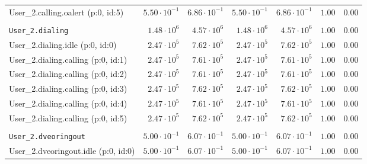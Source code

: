 \begin{table}[htbp]
{\begin{tabular}{lrrrrrr}
\hspace{3mm}User\_2.calling.oalert (p:0, id:5)        & $5.50 \cdot 10^{-1}$ & $6.86 \cdot 10^{-1}$ & $5.50 \cdot 10^{-1}$ & $6.86 \cdot 10^{-1}$ &               $1.00$ &               $0.00$ \\
\\[-8pt]\texttt{User\_2.dialing}                      &  $1.48 \cdot 10^{6}$ &  $4.57 \cdot 10^{6}$ &  $1.48 \cdot 10^{6}$ &  $4.57 \cdot 10^{6}$ &               $1.00$ &               $0.00$ \\
\hspace{3mm}User\_2.dialing.idle (p:0, id:0)          &  $2.47 \cdot 10^{5}$ &  $7.62 \cdot 10^{5}$ &  $2.47 \cdot 10^{5}$ &  $7.62 \cdot 10^{5}$ &               $1.00$ &               $0.00$ \\
\hspace{3mm}User\_2.dialing.calling (p:0, id:1)       &  $2.47 \cdot 10^{5}$ &  $7.61 \cdot 10^{5}$ &  $2.47 \cdot 10^{5}$ &  $7.61 \cdot 10^{5}$ &               $1.00$ &               $0.00$ \\
\hspace{3mm}User\_2.dialing.calling (p:0, id:2)       &  $2.47 \cdot 10^{5}$ &  $7.61 \cdot 10^{5}$ &  $2.47 \cdot 10^{5}$ &  $7.61 \cdot 10^{5}$ &               $1.00$ &               $0.00$ \\
\hspace{3mm}User\_2.dialing.calling (p:0, id:3)       &  $2.47 \cdot 10^{5}$ &  $7.62 \cdot 10^{5}$ &  $2.47 \cdot 10^{5}$ &  $7.62 \cdot 10^{5}$ &               $1.00$ &               $0.00$ \\
\hspace{3mm}User\_2.dialing.calling (p:0, id:4)       &  $2.47 \cdot 10^{5}$ &  $7.61 \cdot 10^{5}$ &  $2.47 \cdot 10^{5}$ &  $7.61 \cdot 10^{5}$ &               $1.00$ &               $0.00$ \\
\hspace{3mm}User\_2.dialing.calling (p:0, id:5)       &  $2.47 \cdot 10^{5}$ &  $7.62 \cdot 10^{5}$ &  $2.47 \cdot 10^{5}$ &  $7.62 \cdot 10^{5}$ &               $1.00$ &               $0.00$ \\
\\[-8pt]\texttt{User\_2.dveoringout}                  & $5.00 \cdot 10^{-1}$ & $6.07 \cdot 10^{-1}$ & $5.00 \cdot 10^{-1}$ & $6.07 \cdot 10^{-1}$ &               $1.00$ &               $0.00$ \\
\hspace{3mm}User\_2.dveoringout.idle (p:0, id:0)      & $5.00 \cdot 10^{-1}$ & $6.07 \cdot 10^{-1}$ & $5.00 \cdot 10^{-1}$ & $6.07 \cdot 10^{-1}$ &               $1.00$ &               $0.00$ \\

\end{tabular}}
\end{table}
